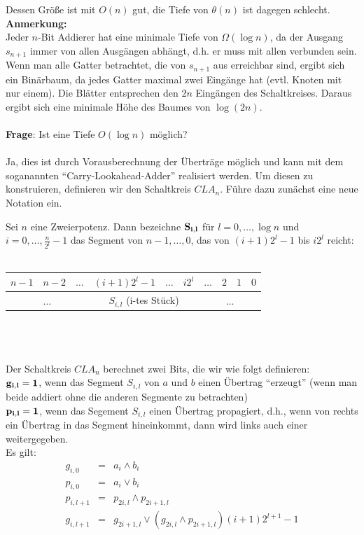 \noindent Dessen Größe ist mit $O(n)$ gut, die Tiefe von $\theta(n)$ ist dagegen schlecht.
\\{\bf{Anmerkung:}}
\\Jeder $n$-Bit Addierer hat eine minimale Tiefe von $\Omega (\log n)$, da der Ausgang $s_{n+1}$ immer von allen Ausgängen abhängt, 
d.h. er muss mit allen verbunden sein. Wenn man alle Gatter betrachtet, die von $s_{n+1}$ aus erreichbar sind, ergibt sich
ein Binärbaum, da jedes Gatter maximal zwei Eingänge hat (evtl. Knoten mit nur einem). Die Blätter entsprechen den $2n$ Eingängen 
des Schaltkreises. Daraus ergibt sich eine minimale Höhe des Baumes von $\log (2n)$.
\\\\{\bf{Frage}}: Ist eine Tiefe $O(\log n)$ möglich? 
\\\\Ja, dies ist durch Vorausberechnung der Überträge möglich und kann mit dem soganannten ``Carry-Lookahead-Adder''
realisiert werden. Um diesen zu konstruieren, definieren wir den Schaltkreis $CLA_n$. 
F\"{u}hre dazu zun\"{a}chst eine neue Notation ein. 

Sei $n$ eine Zweierpotenz. Dann bezeichne $\bf{S_{i,l}}$ für $l=0,\dots,\log n$ und 
$i=0,\dots, \frac{n}{2^l}-1$ das Segment von $n-1, \dots, 0$, das von $(i+1)2^{l}-1$ bis $i2^{l}$ reicht:
\\\\
\begin{tabular}{|c|c|c|c|c|c|c|c|c|c|}
\hline  
$n-1$ & $n-2$ & $\dots$ & $(i+1)2^l-1$ & $\dots$ & $i2^l$ & $\dots$ & $2$ & $1$ & $0$ \\
\hline
\multicolumn{3}{|c|}{$\dots$}& \multicolumn{3}{c|}{ $S_{i,l}$ (i-tes Stück)} &  \multicolumn{4}{c|}{$\dots$}\\
\hline
\end{tabular}
\\
\\\\Der Schaltkreis $CLA_n$ berechnet zwei Bits, die wir wie folgt definieren:
\\$\bf{g_{i,l}} = 1$, wenn das Segment $S_{i,l}$ von $a$ und $b$ einen Übertrag ``erzeugt'' 
(wenn man beide addiert ohne die anderen Segmente zu betrachten)
\\$\bf{p_{i,l}} = 1$, wenn das Segement $S_{i,l}$ einen Übertrag propagiert, 
d.h., wenn von rechts ein Übertrag in das Segment hineinkommt, dann wird links auch einer weitergegeben.
\\Es gilt: 
\begin{eqnarray*}
g_{i,0} & = & a_i \wedge b_i \\
p_{i,0} & = & a_i \vee b_i \\
p_{i,l+1} & = &  p_{2i,l} \wedge p_{2i+1,l} \\
g_{i,l+1} & = & g_{2i+1,l} \vee (g_{2i,l} \wedge p_{2i+1,l})(i+1)2^{l+1}-1  
\end{eqnarray*}

